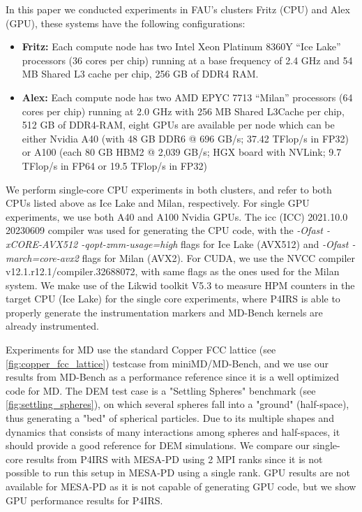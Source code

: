 \documentclass[preprint,12pt]{elsarticle}
\begin{document}
In this paper we conducted experiments in FAU's clusters Fritz (CPU) and Alex (GPU), these systems have the following configurations:

\begin{itemize}
  \item \textbf{Fritz:} Each compute node has two Intel Xeon Platinum 8360Y “Ice Lake” processors (36 cores per chip) running at a base frequency of 2.4 GHz and 54 MB Shared L3 cache per chip, 256 GB of DDR4 RAM.
  \item \textbf{Alex:} Each compute node has two AMD EPYC 7713 “Milan” processors (64 cores per chip) running at 2.0 GHz with 256 MB Shared L3Cache per chip, 512 GB of DDR4-RAM, eight GPUs are available per node which can be either Nvidia A40 (with 48 GB DDR6 @ 696 GB/s; 37.42 TFlop/s in FP32) or A100 (each 80 GB HBM2 @ 2,039 GB/s; HGX board with NVLink; 9.7 TFlop/s in FP64 or 19.5 TFlop/s in FP32)
\end{itemize}

We perform single-core CPU experiments in both clusters, and refer to both CPUs listed above as Ice Lake and Milan, respectively.
For single GPU experiments, we use both A40 and A100 Nvidia GPUs.
The icc (ICC) 2021.10.0 20230609 compiler was used for generating the CPU code, with the \emph{-Ofast -xCORE-AVX512 -qopt-zmm-usage=high} flags for Ice Lake (AVX512) and \emph{-Ofast -march=core-avx2} flags for Milan (AVX2).
For CUDA, we use the NVCC compiler v12.1.r12.1/compiler.32688072, with same flags as the ones used for the Milan system.
We make use of the Likwid toolkit V5.3 \cite{likwid} to measure HPM counters in the target CPU (Ice Lake) for the single core experiments, where P4IRS is able to properly generate the instrumentation markers and MD-Bench kernels are already instrumented.

Experiments for \ac{MD} use the standard Copper FCC lattice (see \autoref{fig:copper_fcc_lattice}) testcase from miniMD/MD-Bench, and we use our results from MD-Bench as a performance reference since it is a well optimized code for \ac{MD}.
The \ac{DEM} test case is a "Settling Spheres" benchmark (see \autoref{fig:settling_spheres}), on which several spheres fall into a "ground" (half-space), thus generating a "bed" of spherical particles.
Due to its multiple shapes and dynamics that consists of many interactions among spheres and half-spaces, it should provide a good reference for DEM simulations.
We compare our single-core results from P4IRS with MESA-PD using 2 MPI ranks since it is not possible to run this setup in MESA-PD using a single rank.
GPU results are not available for MESA-PD as it is not capable of generating GPU code, but we show GPU performance results for P4IRS.
\end{document}
